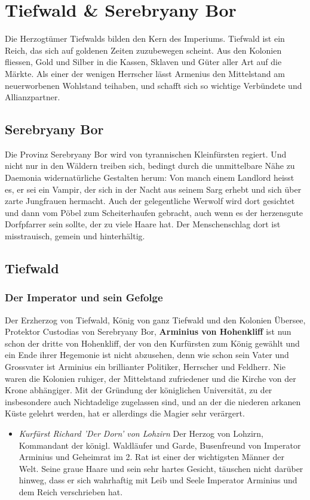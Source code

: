 \documentclass[10pt,twoside,twocolumn,openany]{book}
\begin{document}
\newpage \section{Tiefwald \& Serebryany Bor}
\begin{multicols}{2}
	Die Herzogtümer Tiefwalds bilden den Kern des Imperiums. Tiefwald ist ein Reich, das sich auf goldenen Zeiten zuzubewegen scheint. Aus den Kolonien fliessen, Gold und Silber in die Kassen, Sklaven und Güter aller Art auf die Märkte. Als einer der wenigen Herrscher lässt Armenius den Mittelstand am neuerworbenen Wohlstand teihaben, und schafft sich so wichtige Verbündete und Allianzpartner.
	
	\subsection{Serebryany Bor}
	
	Die Provinz Serebryany Bor wird von tyrannischen Kleinfürsten regiert. Und nicht nur in den Wäldern treiben sich, bedingt durch die unmittelbare Nähe zu Daemonia widernatürliche Gestalten herum: Von manch einem Landlord heisst es, er sei ein Vampir, der sich in der Nacht aus seinem Sarg erhebt und sich über zarte Jungfrauen hermacht. Auch der gelegentliche Werwolf wird dort gesichtet und dann vom Pöbel zum Scheiterhaufen gebracht, auch wenn es der herzensgute Dorfpfarrer sein sollte, der zu viele Haare hat. Der Menschenschlag dort ist misstrauisch, gemein und hinterhältig.
	
	
	\subsection{Tiefwald}
	
	\subsubsection{Der Imperator und sein Gefolge}
	Der Erzherzog von Tiefwald, König von ganz Tiefwald und den Kolonien Übersee, Protektor Custodias von Serebryany Bor, \textbf{Arminius von Hohenkliff} ist nun schon der dritte von Hohenkliff, der von den Kurfürsten zum  König gewählt und ein Ende ihrer Hegemonie ist nicht abzusehen, denn wie schon sein Vater und Grossvater ist Arminius ein brillianter Politiker, Herrscher und Feldherr. Nie waren die Kolonien ruhiger, der Mittelstand zufriedener und die Kirche von der Krone abhängiger. Mit der Gründung der königlichen Universität, zu der insbesondere auch Nichtadelige zugelassen sind, und an der die niederen arkanen Küste gelehrt werden, hat er allerdings die Magier sehr verärgert.
	\begin{itemize}
		\item \textit{Kurfürst Richard 'Der Dorn' von Lohzirn} Der Herzog von Lohzirn, Kommandant der königl. Waldläufer und Garde, Busenfreund von Imperator Arminius und  Geheimrat im 2. Rat ist einer der wichtigsten Männer der Welt. Seine graue Haare und sein sehr hartes Gesicht, täuschen nicht darüber hinweg, dass er sich wahrhaftig mit Leib und Seele Imperator Arminius und dem Reich verschrieben hat.
	\end{itemize}
	

\end{multicols}
\end{document}
